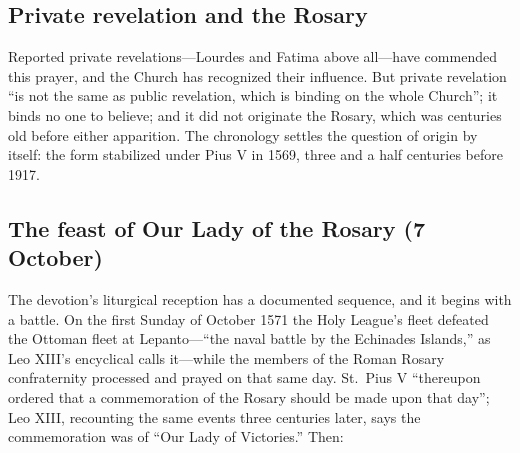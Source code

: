 \subsection{Private revelation and the Rosary}

Reported private revelations---Lourdes and Fatima above all---have
commended this prayer, and the Church has recognized their influence.
But private revelation ``is not the same as public revelation, which is
binding on the whole Church''; it binds no one to believe; and it did
not originate the Rosary, which was centuries old before either
apparition. The chronology settles the question of origin by itself: the
form stabilized under Pius V in 1569, three and a half centuries before
1917.

\subsection{The feast of Our Lady of the Rosary (7 October)}

The devotion's liturgical reception has a documented sequence, and it
begins with a battle. On the first Sunday of October 1571 the Holy
League's fleet defeated the Ottoman fleet at Lepanto---``the naval
battle by the Echinades Islands,'' as Leo XIII's encyclical calls
it---while the members of the Roman Rosary confraternity processed and
prayed on that same day. St.~Pius V ``thereupon ordered that a
commemoration of the Rosary should be made upon that day''; Leo XIII,
recounting the same events three centuries later, says the commemoration
was of ``Our Lady of Victories.'' Then:

